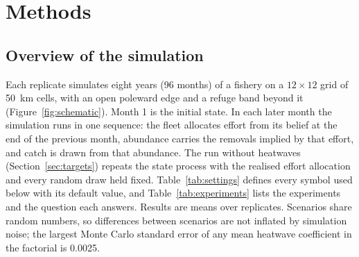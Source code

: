 \documentclass[11pt,a4paper]{article}
\begin{document}
\section{Methods}

\subsection{Overview of the simulation}
\label{sec:overview}

Each replicate simulates eight years (96 months) of a fishery on a $12\times12$ grid of 50~km cells, with an open poleward edge and a refuge band beyond it (Figure~\ref{fig:schematic}). Month 1 is the initial state. In each later month the simulation runs in one sequence: the fleet allocates effort from its belief at the end of the previous month, abundance carries the removals implied by that effort, and catch is drawn from that abundance. The run without heatwaves (Section~\ref{sec:targets}) repeats the state process with the realised effort allocation and every random draw held fixed. Table~\ref{tab:settings} defines every symbol used below with its default value, and Table~\ref{tab:experiments} lists the experiments and the question each answers. Results are means over replicates. Scenarios share random numbers, so differences between scenarios are not inflated by simulation noise; the largest Monte Carlo standard error of any mean heatwave coefficient in the factorial is 0.0025.
\end{document}
